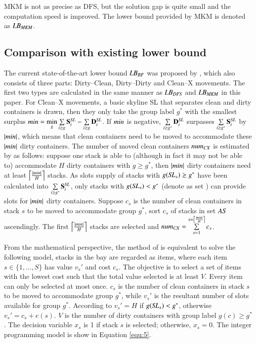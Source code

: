 \documentclass[review,3p,times,authoryear,12pt]{elsarticle}
\begin{document}
MKM is not as precise as DFS, but the solution gap is quite small and the computation speed is improved. The lower bound provided by MKM is denoted as $\id{LB}_{\id{MKM}}$.

\subsection{Comparison with existing lower bound}
The current state-of-the-art lower bound $\id{LB}_\id{BF}$ was proposed by \cite{BF2012}, which also consists of three parts: Dirty--Clean, Dirty--Dirty and Clean--X movements.
The first two types are calculated in the same manner as $\id{LB}_\id{DFS}$ and $\id{LB}_\id{MKM}$ in this paper. For Clean--X movements, a basic skyline SL that separates clean and dirty containers is drawn, then they only take the group label $g^*$ with the smallest surplus $\id{min}=\min\limits_g\sum\limits_{i\ge g}\mathbf S^\id{SL}_i-\sum\limits_{i\ge g}\mathbf D^\id{SL}_i$. If $\id{min}$ is negative, $\sum\limits_{i\ge g^*}\mathbf D^\id{SL}_i$ surpasses $\sum\limits_{i\ge g^*}\mathbf S^\id{SL}_i$ by $|\id{min}|$, which means that clean containers need to be moved to accommodate these $|\id{min}|$ dirty containers. The number of moved clean containers $\id{num}_\id{CX}$ is estimated by \cite{BF2012} as follows: suppose one stack is able to (although in fact it may not be able to) accommodate $H$ dirty containers with $g\ge g^*$, then $|\id{min}|$ dirty containers need at least $\left\lceil\frac{|\id{min}|}{H}\right\rceil$ stacks. As slots supply of stacks with $g(\id{SL}_s)\ge g^*$ have been calculated into $\sum\limits_{i\ge g^*}\mathbf S^\id{SL}_i$, only stacks with $g(\id{SL}_s)< g^*$ (denote as set ) can provide slots for $|\id{min}|$ dirty containers. Suppose $c_s$ is the number of clean containers in stack $s$ to be moved to accommodate group $g^*$, sort $c_s$ of stacks in set $\id{AS}$ ascendingly. The first $\left\lceil\frac{|\id{min}|}{H}\right\rceil$ stacks are selected and $\id{num}_\id{CX}=\sum\limits_{s=1}^{s=\left\lceil\frac{|\id{min}|}{H}\right\rceil}c_s$.

From the mathematical perspective, the method of \cite{BF2012} is equivalent to solve the following model, stacks in the bay are regarded as items, where each item $s\in\{1,\dots,S\}$ has value $v_s'$ and cost $c_s$. The objective is to select a set of items with the lowest cost such that the total value selected is at least $V$. Every item can only be selected at most once. $c_s$ is the number of clean containers in stack $s$ to be moved to accommodate group $g^*$, while $v_s'$ is the resultant number of slots available for group $g^*$. According to \cite{BF2012} $v_s'=H$ if $g(\id{SL}_s)<g^*$, otherwise $v_s'=c_s+e(s)$. $V$ is the number of dirty containers with group label $g(c)\ge g^*$. The decision variable $x_s$ is 1 if stack $s$ is selected; otherwise, $x_s=0$. The integer programming model is show in Equation \ref{equ:5}.
\end{document}
